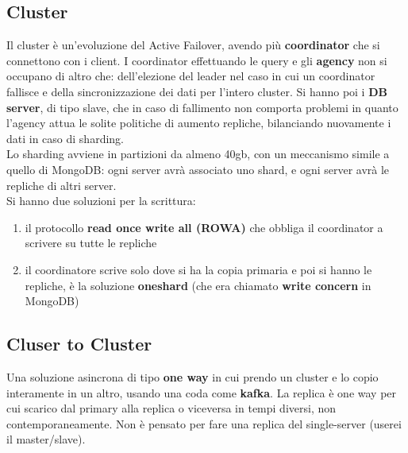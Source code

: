 \subsection{Cluster}
Il cluster è un'evoluzione del Active Failover, avendo più \textbf{coordinator} che si connettono con i client. I coordinator effettuando le query e gli \textbf{agency} non si occupano di altro che: dell'elezione del leader nel caso in cui un coordinator fallisce e della sincronizzazione dei dati per l'intero cluster. 
Si hanno poi i \textbf{DB server}, di tipo slave, che in caso di fallimento non comporta problemi in quanto l'agency attua le solite politiche di aumento repliche, bilanciando nuovamente i dati in caso di sharding.\\ 

Lo sharding avviene in partizioni da almeno 40gb, con un meccanismo simile a quello di MongoDB: ogni server avrà associato uno shard, e ogni server avrà le repliche di altri server. \\
Si hanno due soluzioni per la scrittura: 
\begin{enumerate} 
    \item il protocollo \textbf{read once write all (ROWA)} che obbliga il coordinator a scrivere su tutte le repliche 
    \item il coordinatore scrive solo dove si ha la copia primaria e poi si hanno le repliche, è la soluzione \textbf{oneshard} (che era chiamato \textbf{write concern} in MongoDB) 
\end{enumerate}

\subsection{Cluser to Cluster}
Una soluzione asincrona di tipo \textbf{one way} in cui prendo un cluster e lo copio interamente in un altro, usando una coda come \textbf{kafka}. La replica è one way per cui scarico dal primary alla replica o viceversa in tempi diversi, non contemporaneamente. Non è pensato per fare una replica del single-server (userei il master/slave).
